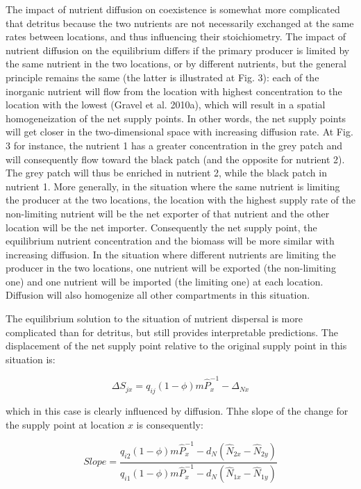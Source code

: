 \documentclass[letterpaper,twocolumn,showkeys]{revtex4-1}
\begin{document}
The impact of nutrient diffusion on coexistence is somewhat more complicated that detritus because the two nutrients are not necessarily exchanged at the same rates between locations, and thus influencing their stoichiometry. The impact of nutrient diffusion on the equilibrium differs if the primary producer is limited by the same nutrient in the two locations, or by different nutrients, but the general principle remains the same (the latter is illustrated at Fig. 3): each of the inorganic nutrient will flow from the location with highest concentration to the location with the lowest (Gravel et al. 2010a), which will result in a spatial homogeneization of the net supply points. In other words, the net supply points will get closer in the two-dimensional space with increasing diffusion rate. At Fig. 3 for instance, the nutrient 1 has a greater concentration in the grey patch and will consequently flow toward the black patch (and the opposite for nutrient 2). The grey patch will thus be enriched in nutrient 2, while the black patch in nutrient 1. More generally, in the situation where the same nutrient is limiting the producer at the two locations, the location with the highest supply rate of the non-limiting nutrient will be the net exporter of that nutrient and the other location will be the net importer. Consequently the net supply point, the equilibrium nutrient concentration and the biomass will be more similar with increasing diffusion. In the situation where different nutrients are limiting the producer in the two locations, one nutrient will be exported (the non-limiting one) and one nutrient will be imported (the limiting one) at each location. Diffusion will also homogenize all other compartments in this situation. 

	The equilibrium solution to the situation of nutrient dispersal is more complicated than for detritus, but still provides interpretable predictions. The displacement of the net supply point relative to the original supply point in this situation is:

\begin{equation}
	\label{e:bnet}
	\Delta S_{jx}=q_{ij}(1-\phi) m\widehat{P}_{x}^{-1}-\Delta_{Nx}
\end{equation}

which in this case is clearly influenced by diffusion. Thhe slope of the change for the supply point at location $x$ is consequently:

\begin{equation}
	\label{e:bnet}
	Slope=\frac{q_{i2}(1-\phi) m\widehat{P}_{x}^{-1}-d_{N}(\widehat{N}_{2x}-\widehat{N}_{2y})}{q_{i1}(1-\phi) m\widehat{P}_{x}^{-1}-d_{N}(\widehat{N}_{1x}-\widehat{N}_{1y})}
\end{equation}
\end{document}
